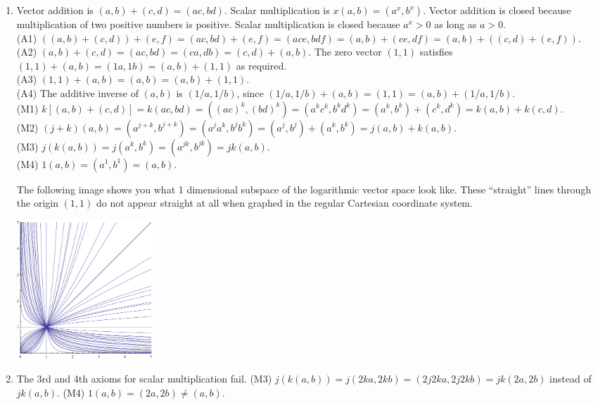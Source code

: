 {\begin{multicols}{2}
\begin{enumerate}
\begin{enumerate}
	You could change ``the entire real number line'' to any interval, and nothing above would change.
	
	\item Vector addition is $(a,b)+(c,d) = (ac,bd)$.  Scalar multiplication  is $x(a,b) = (a^x, b^x)$. Vector addition is closed because multiplication of two positive numbers is positive.  Scalar multiplication  is closed because $a^x> 0$ as long as $a>0$. 
\\	(A1) $((a,b)+(c,d))+(e,f) =(ac,bd)+(e,f) =(ace,bdf) =(a,b)+(ce,df) = (a,b)+((c,d)+(e,f))$. 
\\	(A2)  $(a,b)+(c,d) =(ac,bd) = (ca,db) = (c,d)+(a,b)$. The zero vector $(1,1)$ satisfies $(1,1)+(a,b) = (1a,1b)=(a,b)+(1,1)$ as required.
\\	(A3) $(1,1)+(a,b) = (a,b) = (a,b)+(1,1)$.
\\	(A4) The additive inverse of $(a,b)$ is $(1/a,1/b)$, since $(1/a,1/b)+(a,b) = (1,1) = (a,b)+(1/a,1/b)$.
\\	(M1) $k[(a,b)+(c,d)] = k(ac,bd) = ((ac)^k,(bd)^k) = (a^kc^k,b^kd^k) = (a^k,b^k)+(c^k,d^k)=k(a,b)+k(c,d)$.
\\	(M2) $(j+k)(a,b) = (a^{j+k},b^{j+k}) = (a^ja^k,b^jb^k) = (a^j,b^j)+(a^k,b^k) = j(a,b)+k(a,b)$.
\\	(M3) $j(k(a,b)) = j(a^k,b^k)=(a^{jk},b^{jk})=jk(a,b)$.
\\	(M4) $1(a,b) = (a^1,b^1)=(a,b)$.
	  
	  The following image shows you what 1 dimensional subspace of the logarithmic vector space look like.  These ``straight'' lines through the origin $(1,1)$ do not appear straight at all when graphed in the regular Cartesian coordinate system.
	  
	  \includegraphics[width=2in]{Patterns/support/logspace-picture}

	\item The 3rd and 4th axioms for scalar multiplication fail. 
	(M3) $j(k(a,b)) = j(2ka,2kb)=(2j2ka,2j2kb)=jk(2a,2b)$ instead of $jk(a,b)$.
	(M4) $1(a,b) = (2a,2b)\neq (a,b)$.
	

\end{enumerate}
\end{enumerate}
\end{multicols}}

